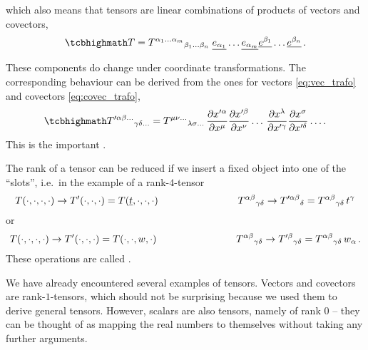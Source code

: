 \documentclass[../relativity_main.tex]{subfiles}
\begin{document}
which also means that tensors are linear combinations of products of vectors and covectors,
\begin{equation}\label{eq:tensor_local}
\eqbox{
T = T^{\alpha_1 \dots \alpha_m}{}_{\beta_1 \dots \beta_n} \; \fvec{e_{\alpha_1}} \dots \fvec{e_{\alpha_m}} \fvec{e^{\beta_1}} \dots \fvec{e^{\beta_n}}
} \, .
\end{equation}

These components do change under coordinate transformations. The corresponding behaviour can be derived from the ones for vectors \eqref{eq:vec_trafo} and covectors \eqref{eq:covec_trafo},
\begin{equation}\label{eq:tensor_trafo}
\eqbox{
T'^{\alpha \beta \dots}{}_{\gamma \delta \dots} = T^{\mu \nu \dots}{}_{\lambda \sigma \dots} \, \pdv{x'^\alpha}{x^\mu} \pdv{x'^\beta}{x^\nu} \dots \, \pdv{x^\lambda}{x'^\gamma} \pdv{x^\sigma}{x'^\delta} \dots
} \, .
\end{equation}
This is the important .


The rank of a tensor can be reduced if we insert a fixed object into one of the \enquote{slots}, i.e.~in the example of a rank-$4$-tensor
\begin{equation}
T(\cdot, \cdot, \cdot, \cdot) \rightarrow T'(\cdot, \cdot, \cdot) = T(\underline{t}, \cdot, \cdot, \cdot) \qquad \qquad \qquad \qquad T^{\alpha \beta}{}_{\gamma \delta} \rightarrow T'^{\alpha \beta}{}_{\delta} = T^{\alpha \beta}{}_{\gamma \delta} \, t^\gamma
\end{equation}
or
\begin{equation}
T(\cdot, \cdot, \cdot, \cdot) \rightarrow T'(\cdot, \cdot, \cdot) = T(\cdot, \cdot, w, \cdot)
\qquad \qquad \qquad \qquad
T^{\alpha \beta}{}_{\gamma \delta} \rightarrow T'^{\beta}{}_{\gamma \delta} = T^{\alpha \beta}{}_{\gamma \delta} \, w_\alpha \, .
\end{equation}
These operations are called .



\begin{ex}
We have already encountered several examples of tensors. Vectors and covectors are rank-$1$-tensors, which should not be surprising because we used them to derive general tensors. However, scalars are also tensors, namely of rank $0$ -- they can be thought of as mapping the real numbers to themselves without taking any further arguments.
\end{ex}
\end{document}

